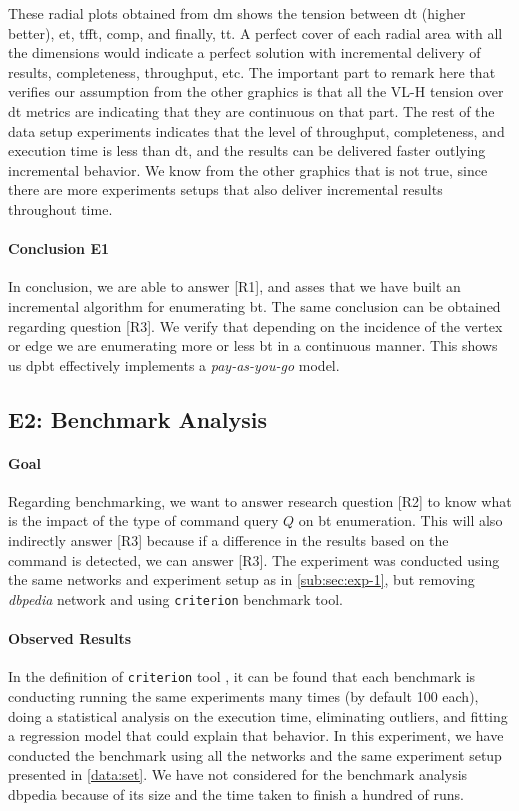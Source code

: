  These radial plots obtained from \acrshort{dm} shows the tension between \acrfull{dt} (higher better),
 \acrfull{et}, \acrfull{tfft}, \acrfull{comp}, and finally, \acrfull{tt}. A perfect cover of each radial area with all the dimensions would
 indicate a perfect solution with incremental delivery of results, completeness, throughput, etc. The important part to remark here that verifies
 our assumption from the other graphics is that all the VL-H tension over \acrshort{dt} metrics are indicating that they are continuous on that part. 
 The rest of the data setup experiments indicates that the level of throughput, completeness, and execution time is less than \acrfull{dt}, and the results can be delivered faster outlying incremental behavior. 
 We know from the other graphics that is not true, since there are more experiments setups that also deliver incremental results throughout time.
 
 \paragraph{Conclusion E1} In conclusion, we are able to answer [R1], and asses that we have built an incremental algorithm for enumerating \acrlong{bt}. 
 The same conclusion can be obtained regarding question [R3]. We verify that depending on the incidence of the vertex or edge we are enumerating more or less \acrshort{bt} in a continuous manner. This shows us \acrshort{dpbt} effectively implements a \emph{pay-as-you-go} model.
 

\subsection{E2: Benchmark Analysis}\label{sub:sec:exp-2} 
\paragraph{Goal} Regarding benchmarking, we want to answer research question [R2] to know what is the impact of the type of command query $Q$ on \acrshort{bt} enumeration.
This will also indirectly answer [R3] because if a difference in the results based on the command is detected, we can answer [R3]. The experiment was conducted using the same networks and 
experiment setup as in \autoref{sub:sec:exp-1}, but removing \emph{\acrshort{dbpedia}} network and using \texttt{criterion} \cite{criterion} benchmark tool.

\paragraph{Observed Results}\label{sub:sec:res:e2}
In the definition of \texttt{criterion} tool \cite{criterion}, it can be found that each benchmark is conducting running the same experiments many times (by default 100 each),
doing a statistical analysis on the execution time, eliminating outliers, and fitting a regression model that could explain that behavior. 
In this experiment, we have conducted the benchmark using all the networks and the same experiment setup presented in \autoref{data:set}. 
We have not considered for the benchmark analysis \acrshort{dbpedia} because of its size and the time taken to finish a hundred of runs.

